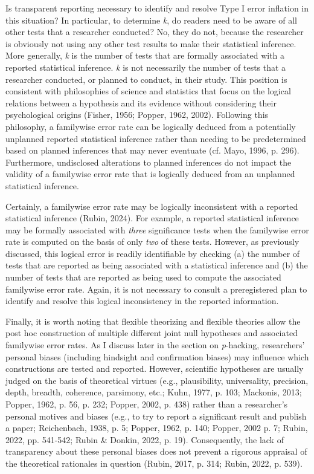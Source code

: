 \documentclass[authordate, meta]{jote-new-article}
\begin{document}
	Is transparent reporting necessary to identify and resolve Type I error inflation in this situation? In particular, to determine \emph{k}, do readers need to be aware of all other tests that a researcher conducted? No, they do not, because the researcher is obviously not using any other test results to make their statistical inference. More generally, \emph{k} is the number of tests that are formally associated with a reported statistical inference. \emph{k} is not necessarily the number of tests that a researcher conducted, or planned to conduct, in their study. This position is consistent with philosophies of science and statistics that focus on the logical relations between a hypothesis and its evidence without considering their psychological origins (Fisher, 1956; Popper, 1962, 2002). Following this philosophy, a familywise error rate can be logically deduced from a potentially unplanned reported statistical inference rather than needing to be predetermined based on planned inferences that may never eventuate (cf. Mayo, 1996, p. 296). Furthermore, undisclosed alterations to planned inferences do not impact the validity of a familywise error rate that is logically deduced from an unplanned statistical inference.



	Certainly, a familywise error rate may be logically inconsistent with a reported statistical inference (Rubin, 2024). For example, a reported statistical inference may be formally associated with \emph{three} significance tests when the familywise error rate is computed on the basis of only \emph{two} of these tests. However, as previously discussed, this logical error is readily identifiable by checking (a) the number of tests that are reported as being associated with a statistical inference and (b) the number of tests that are reported as being used to compute the associated familywise error rate. Again, it is not necessary to consult a preregistered plan to identify and resolve this logical inconsistency in the reported information.



	Finally, it is worth noting that flexible theorizing and flexible theories allow the post hoc construction of multiple different joint null hypotheses and associated familywise error rates. As I discuss later in the section on \emph{p}-hacking, researchers' personal biases (including hindsight and confirmation biases) may influence which constructions are tested and reported. However, scientific hypotheses are usually judged on the basis of theoretical virtues (e.g., plausibility, universality, precision, depth, breadth, coherence, parsimony, etc.; Kuhn, 1977, p. 103; Mackonis, 2013; Popper, 1962, p. 56, p. 232; Popper, 2002, p. 438) rather than a researcher's personal motives and biases (e.g., to try to report a significant result and publish a paper; Reichenbach, 1938, p. 5; Popper, 1962, p. 140; Popper, 2002 p. 7; Rubin, 2022, pp. 541-542; Rubin \& Donkin, 2022, p. 19). Consequently, the lack of transparency about these personal biases does not prevent a rigorous appraisal of the theoretical rationales in question (Rubin, 2017, p. 314; Rubin, 2022, p. 539).
\end{document}
